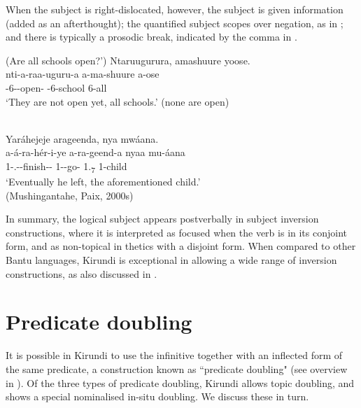 \documentclass[output=paper]{langscibook}
\begin{document}
\z

When the subject is right-dislocated, however, the subject is given information (added as an afterthought); the quantified subject scopes over negation, as in ; and there is typically a prosodic break, indicated by the comma in .

\ea
\label{bkm:Ref75350086}
(Are all schools open?’)
Ntaruugurura, amashuure yoose.\\
\gll
nti-a-raa-uguru-a  a-ma-shuure  a-ose\\
\NEG{}-6\SM{}-\INCP{}-open-\FV{}  \AUG{}-6-school  6-all\\
\glt
‘They are not open yet, all schools.’ (none are open)\\

\z

\ea
\label{bkm:Ref75350104}
\citep[57]{Nshemezimana2016}\\
Yaráhejeje arageenda, nya mwáana.\\
\gll
a-á-ra-hér-i-ye  a-ra-geend-a  nyaa  mu-áana\\
1\SM-\RMT.\PST-\DJ-{}finish-\CAUS{}-\PFV{}  {}1\SM{}-\DJ{}-go-\FV{}  {}1.\DEM{}\textsubscript{7}  1-child\\
\glt
‘Eventually he left, the aforementioned child.’\\
  (Mushingantahe, Paix, 2000s)


\z

In summary, the logical subject appears postverbally in subject inversion constructions, where it is interpreted as focused when the verb is in its conjoint form, and as non-topical in thetics with a disjoint form. When compared to other Bantu languages, Kirundi is exceptional in allowing a wide range of inversion constructions, as also discussed in \citet{KerrEtAl2023}.

\section{Predicate doubling}
\label{bkm:Ref75783502}
It is possible in Kirundi to use the infinitive together with an inflected form of the same predicate, a construction known as ``predicate doubling" (see overview in \citealt{GüldemannFiedler2022}). Of the three types of predicate doubling, Kirundi allows topic doubling, and shows a special nominalised in-situ doubling. We discuss these in turn.
\end{document}
